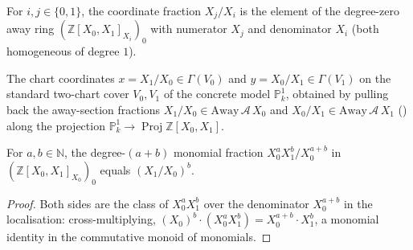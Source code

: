 \begin{definition}
  \label{def:adelic_p1CoordAway}
  \leanok
  For \(i, j \in \{0, 1\}\), the coordinate fraction \(X_j/X_i\) is the
  element of the degree-zero away ring \((\mathbb{Z}[X_0,X_1]_{X_i})_0\)
  with numerator \(X_j\) and denominator \(X_i\) (both homogeneous of
  degree \(1\)).
\end{definition}

\begin{definition}
  \label{def:adelic_p1_chart_sections}
  \leanok
  The chart coordinates \(x = X_1/X_0 \in \Gamma(V_0)\) and
  \(y = X_0/X_1 \in \Gamma(V_1)\) on the standard two-chart cover
  \(V_0, V_1\) of the concrete model \(\mathbb{P}^1_k\), obtained by
  pulling back the away-section fractions
  \(X_1/X_0 \in \mathrm{Away}\,\mathcal A\,X_0\) and
  \(X_0/X_1 \in \mathrm{Away}\,\mathcal A\,X_1\)
  () along the projection
  \(\mathbb{P}^1_k \to \operatorname{Proj}\mathbb{Z}[X_0,X_1]\).
\end{definition}

\begin{lemma}
  \label{lem:adelic_p1Monomial_eq_coordPow}
  \leanok
  For \(a, b \in \mathbb{N}\), the degree-\((a+b)\) monomial fraction
  \(X_0^a X_1^b / X_0^{a+b}\) in \((\mathbb{Z}[X_0,X_1]_{X_0})_0\) equals
  \((X_1/X_0)^b\).
\end{lemma}
\begin{proof}
  \leanok
  Both sides are the class of \(X_0^a X_1^b\) over the denominator
  \(X_0^{a+b}\) in the localisation: cross-multiplying,
  \((X_0)^b \cdot (X_0^a X_1^b) = X_0^{a+b} \cdot X_1^b\), a monomial
  identity in the commutative monoid of monomials.
\end{proof}

